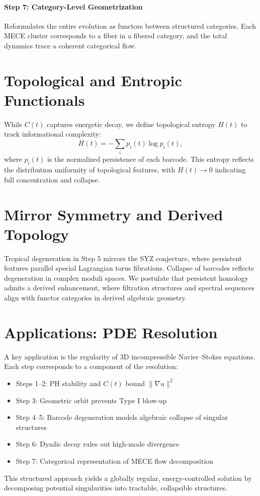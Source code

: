 \documentclass[11pt]{article}
\begin{document}
\paragraph{Step 7: Category-Level Geometrization} Reformulates the entire evolution as functors between structured categories. Each MECE cluster corresponds to a fiber in a fibered category, and the total dynamics trace a coherent categorical flow.

\section{Topological and Entropic Functionals}
While $C(t)$ captures energetic decay, we define topological entropy $H(t)$ to track informational complexity:
\begin{equation}
H(t) = -\sum_{i} p_i(t) \log p_i(t),
\end{equation}
where $p_i(t)$ is the normalized persistence of each barcode. This entropy reflects the distribution uniformity of topological features, with $H(t) \to 0$ indicating full concentration and collapse.

\section{Mirror Symmetry and Derived Topology}
Tropical degeneration in Step 5 mirrors the SYZ conjecture, where persistent features parallel special Lagrangian torus fibrations. Collapse of barcodes reflects degeneration in complex moduli spaces. We postulate that persistent homology admits a derived enhancement, where filtration structures and spectral sequences align with functor categories in derived algebraic geometry.

\section{Applications: PDE Resolution}
A key application is the regularity of 3D incompressible Navier–Stokes equations. Each step corresponds to a component of the resolution:
\begin{itemize}
  \item Steps 1–2: PH stability and $C(t)$ bound $\|\nabla u\|^2$
  \item Step 3: Geometric orbit prevents Type I blow-up
  \item Step 4–5: Barcode degeneration models algebraic collapse of singular structures
  \item Step 6: Dyadic decay rules out high-mode divergence
  \item Step 7: Categorical representation of MECE flow decomposition
\end{itemize}
This structured approach yields a globally regular, energy-controlled solution by decomposing potential singularities into tractable, collapsible structures.
\end{document}
